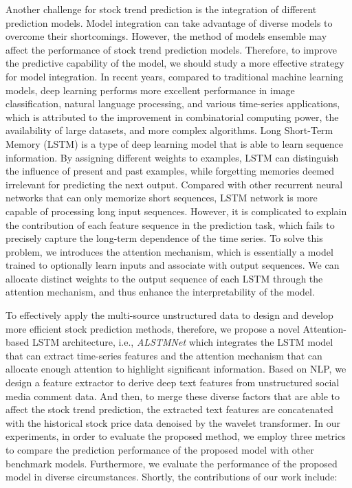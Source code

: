 \documentclass[sn-mathphys]{sn-jnl}%
\theoremstyle{thmstyleone}%
\theoremstyle{thmstyletwo}%
\theoremstyle{thmstylethree}%
\begin{document}
Another challenge for stock trend prediction is the integration of different prediction models. Model integration can take advantage of diverse models to overcome their shortcomings\cite{RN162}. However, the method of models ensemble may affect the performance of stock trend prediction models. Therefore, to improve the predictive capability of the model, we should study a more effective strategy for model integration. In recent years, compared to traditional machine learning models, deep learning performs more excellent performance in image classification, natural language processing, and various time-series applications, which is attributed to the improvement in combinatorial computing power, the availability of large datasets, and more complex algorithms\cite{RN173}. Long Short-Term Memory (LSTM) is a type of deep learning model that is able to learn sequence information. By assigning different weights to examples, LSTM can distinguish the influence of present and past examples, while forgetting memories deemed irrelevant for predicting the next output. Compared with other recurrent neural networks that can only memorize short sequences, LSTM network is more capable of processing long input sequences\cite{RN183}. However, it is complicated to explain the contribution of each feature sequence in the prediction task, which fails to precisely capture the long-term dependence of the time series. To solve this problem, we introduces the attention mechanism, which is essentially a model trained to optionally learn inputs and associate with output sequences\cite{RN193}. We can allocate distinct weights to the output sequence of each LSTM through the attention mechanism, and thus enhance the interpretability of the model.

To effectively apply the multi-source unstructured data to design and develop more efficient stock prediction methods, therefore, we propose a novel Attention-based LSTM architecture, i.e., {\it ALSTMNet} which integrates the LSTM model that can extract time-series features and the attention mechanism that can allocate enough attention to highlight significant information. Based on NLP, we design a feature extractor to derive deep text features from unstructured social media comment data. And then, to merge these diverse factors that are able to affect the stock trend prediction, the extracted text features are concatenated with the historical stock price data denoised by the wavelet transformer. In our experiments, in order to evaluate the proposed method, we employ three metrics to compare the prediction performance of the proposed model with other benchmark models. Furthermore, we evaluate the performance of the proposed model in diverse circumstances. Shortly, the contributions of our work include:
\end{document}
